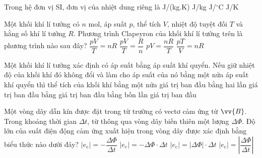 	\begin{ex}%
		Trong hệ đơn vị SI, đơn vị của nhiệt dung riêng là
		\choice
		{\True J/(kg.K)}
		{J/kg}
		{J/$^\circ$C}
		{J/K}
	\end{ex}

	\begin{ex}%
		Một khối khí lí tưởng có $n$ mol, áp suất $p$, thể tích $V$, nhiệt độ tuyệt đối $T$ và hằng số khí lí tưởng $R$. Phương trình Clapeyron của khối khí lí tưởng trên là phương trình nào sau đây?
		\choice
		{\True $\dfrac{pV}{T}=nR$}
		{$\dfrac{pV}{T}=\dfrac{R}{n}$}
		{$pV=\dfrac{nR}{T}$}
		{$\dfrac{pT}{V}=nR$}
	\end{ex}

	\begin{ex}%
		Một khối khí lí tưởng xác định có áp suất bằng áp suất khí quyển. Nếu giữ nhiệt độ của khối khí đó không đổi và làm cho áp suất của nó bằng một nửa áp suất khí quyển thì thể tích của khối khí
		\choice
		{bằng một nửa giá trị ban đầu}
		{\True bằng hai lần giá trị ban đầu}
		{bằng giá trị ban đầu}
		{bằng bốn lần giá trị ban đầu}
	\end{ex}

	\begin{ex}%
		Một vòng dây dẫn kín được đặt trong từ trường có vectơ cảm ứng từ $\vv{B}$. Trong khoảng thời gian $\Delta t$, từ thông qua vòng dây biến thiên một lượng $\Delta\Phi$. Độ lớn của suất điện động cảm ứng xuất hiện trong vòng dây được xác định bằng biểu thức nào dưới đây?
		\choice
		{$|e_\text{c}|=-\dfrac{\Delta\Phi}{\Delta t}$}
		{$|e_\text{c}|=-\Delta\Phi\cdot\Delta t$}
		{$|e_\text{c}|=|\Delta\Phi|\cdot\Delta t$}
		{\True $|e_\text{c}|=\left|\dfrac{\Delta\Phi}{\Delta t}\right|$}
	\end{ex}

